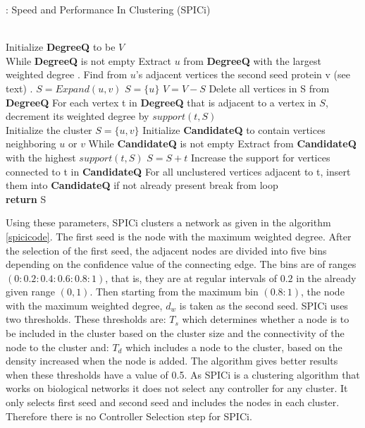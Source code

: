 \documentclass[times]{dacauth}
\begin{document}
\begin{algorithm}
	\caption{: Speed and Performance In Clustering (SPICi)}\label{spicicode}
	\begin{algorithmic}[1]
		 \\
		Initialize \textbf{DegreeQ} to be $V$ \\
		While \textbf{DegreeQ} is not empty
		\State Extract $u$ from \textbf{DegreeQ} with the largest weighted degree
		. Find from $u$’s adjacent vertices the second seed protein v (see text)
		. $S=Expand(u,v)$
		\Else 
		\State $S=\{u\}$
		\EndIf
		\State $V=V-S$
		\State Delete all vertices in S from \textbf{DegreeQ}
		\State For each vertex t in \textbf{DegreeQ} that is adjacent to a vertex in $S$, decrement its weighted degree by $support(t,S)$
		\EndProcedure
		\\
		Initialize the cluster $S=\{u,v\}$
		Initialize \textbf{CandidateQ} to contain vertices neighboring $u$ or $v$
		While \textbf{CandidateQ} is not empty
		\State Extract from \textbf{CandidateQ} with the highest $support(t,S)$
		\State $S=S+{t}$
		\State Increase the support for vertices connected to t in
		\textbf{CandidateQ}
		\State For all unclustered vertices adjacent to t, insert them
		into \textbf{CandidateQ} if not already present
		\Else
		\State break from loop
		\EndIf \\
		\textbf{return} S
		\EndProcedure
	\end{algorithmic}
\end{algorithm}
Using these parameters, SPICi clusters a network as given in the algorithm \ref{spicicode}.
The first seed is the node with the maximum weighted degree. 
After the selection of the first seed, the adjacent nodes are divided into five bins depending on the confidence value of the connecting edge. The bins are of ranges $(0:0.2:0.4:0.6:0.8:1)$, that is, they are at regular intervals of $0.2$ in the already given range $(0,1)$. Then starting from the maximum bin $(0.8:1)$, the node with the maximum weighted degree, $d_w$ is taken as the second seed.
SPICi uses two thresholds. These thresholds are: $T_s$ which determines whether a node is to be included in the cluster based on the cluster size and the connectivity of the node to the cluster and: $T_d$ which includes a node to the cluster, based on the density increased when the node is added. The algorithm gives better results when these thresholds have a value of 0.5\cite{spici2010}.
As SPICi is a clustering algorithm that works on biological networks it does not select any controller for any cluster. It only selects first seed and second seed and includes the nodes in each cluster. Therefore there is no Controller Selection step for SPICi.
\end{document}
